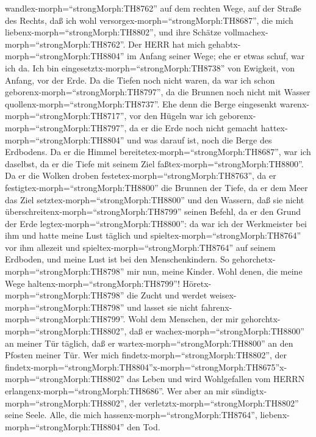 wandlex-morph=``strongMorph:TH8762'' auf dem rechten Wege, auf der
Straße des Rechts,  daß ich wohl
versorgex-morph=``strongMorph:TH8687'', die mich
liebenx-morph=``strongMorph:TH8802'', und ihre Schätze
vollmachex-morph=``strongMorph:TH8762''.  Der HERR hat mich
gehabtx-morph=``strongMorph:TH8804'' im Anfang seiner Wege; ehe er etwas
schuf, war ich da.  Ich bin
eingesetztx-morph=``strongMorph:TH8738'' von Ewigkeit, von Anfang, vor
der Erde.  Da die Tiefen noch nicht waren, da war ich schon
geborenx-morph=``strongMorph:TH8797'', da die Brunnen noch nicht mit
Wasser quollenx-morph=``strongMorph:TH8737''.  Ehe denn die
Berge eingesenkt warenx-morph=``strongMorph:TH8717'', vor den Hügeln war
ich geborenx-morph=``strongMorph:TH8797'',  da er die Erde
noch nicht gemacht hattex-morph=``strongMorph:TH8804'' und was darauf
ist, noch die Berge des Erdbodens.  Da er die Himmel
bereitetex-morph=``strongMorph:TH8687'', war ich daselbst, da er die
Tiefe mit seinem Ziel faßtex-morph=``strongMorph:TH8800''. 
Da er die Wolken droben festetex-morph=``strongMorph:TH8763'', da er
festigtex-morph=``strongMorph:TH8800'' die Brunnen der Tiefe,
 da er dem Meer das Ziel
setztex-morph=``strongMorph:TH8800'' und den Wassern, daß sie nicht
überschreitenx-morph=``strongMorph:TH8799'' seinen Befehl, da er den
Grund der Erde legtex-morph=``strongMorph:TH8800'':  da war
ich der Werkmeister bei ihm und hatte meine Lust täglich und
spieltex-morph=``strongMorph:TH8764'' vor ihm allezeit  und
spieltex-morph=``strongMorph:TH8764'' auf seinem Erdboden, und meine
Lust ist bei den Menschenkindern.  So
gehorchetx-morph=``strongMorph:TH8798'' mir nun, meine Kinder. Wohl
denen, die meine Wege haltenx-morph=``strongMorph:TH8799''!
 Höretx-morph=``strongMorph:TH8798'' die Zucht und werdet
weisex-morph=``strongMorph:TH8798'' und lasset sie nicht
fahrenx-morph=``strongMorph:TH8799''.  Wohl dem Menschen,
der mir gehorchtx-morph=``strongMorph:TH8802'', daß er
wachex-morph=``strongMorph:TH8800'' an meiner Tür täglich, daß er
wartex-morph=``strongMorph:TH8800'' an den Pfosten meiner Tür.
 Wer mich findetx-morph=``strongMorph:TH8802'', der
findetx-morph=``strongMorph:TH8804''\textbar x-morph=``strongMorph:TH8675''x-morph=``strongMorph:TH8802''
das Leben und wird Wohlgefallen vom HERRN
erlangenx-morph=``strongMorph:TH8686''.  Wer aber an mir
sündigtx-morph=``strongMorph:TH8802'', der
verletztx-morph=``strongMorph:TH8802'' seine Seele. Alle, die mich
hassenx-morph=``strongMorph:TH8764'',
liebenx-morph=``strongMorph:TH8804'' den Tod.

